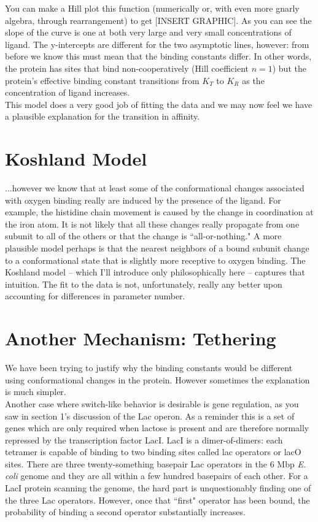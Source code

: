 \documentclass{article}
\begin{document}
You can make a Hill plot this function (numerically or, with even more gnarly algebra, through rearrangement) to get [INSERT GRAPHIC]. As you can see the slope of the curve is one at both very large and very small concentrations of ligand. The y-intercepts are different for the two asymptotic lines, however: from before we know this must mean that the binding constants differ. In other words, the protein has sites that bind non-cooperatively (Hill coefficient $n=1$) but the protein's effective binding constant transitions from $K_T$ to $K_R$ as the concentration of ligand increases.\\

This model does a very good job of fitting the data and we may now feel we have a plausible explanation for the transition in affinity.

\section*{Koshland Model}
...however we know that at least some of the conformational changes associated with oxygen binding really are induced by the presence of the ligand. For example, the histidine chain movement is caused by the change in coordination at the iron atom. It is not likely that all these changes really propagate from one subunit to all of the others or that the change is ``all-or-nothing." A more plausible model perhaps is that the nearest neighbors of a bound subunit change to a conformational state that is slightly more receptive to oxygen binding. The Koshland model -- which I'll introduce only philosophically here -- captures that intuition. The fit to the data is not, unfortunately, really any better upon accounting for differences in parameter number.

\section*{Another Mechanism: Tethering}
We have been trying to justify why the binding constants would be different using conformational changes in the protein. However sometimes the explanation is much simpler.\\

Another case where switch-like behavior is desirable is gene regulation, as you saw in section 1's discussion of the Lac operon. As a reminder this is a set of genes which are only required when lactose is present and are therefore normally repressed by the transcription factor LacI. LacI is a dimer-of-dimers: each tetramer is capable of binding to two binding sites called lac operators or lacO sites. There are three twenty-something basepair Lac operators in the 6 Mbp \textit{E. coli} genome and they are all within a few hundred basepairs of each other. For a LacI protein scanning the genome, the hard part is unquestionably finding one of the three Lac operators. However, once that ``first" operator has been bound, the probability of binding a second operator substantially increases.\\
\end{document}
